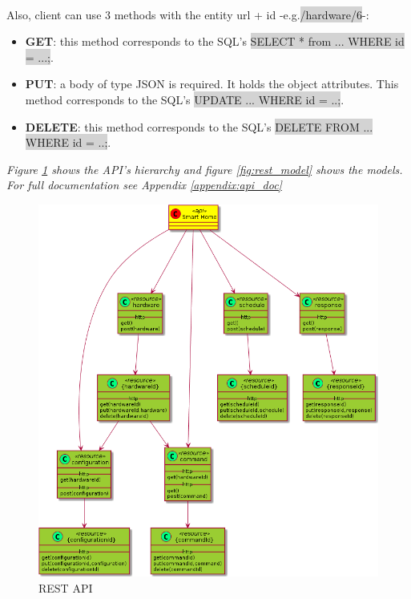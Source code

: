 \documentclass[12pt, oneside, a4paper]{book}
\newcommand{\code}[1]{{\color{red}\colorbox{lightgray}{#1}}}
\begin{document}
			 	\paragraph{}Also, client can use 3 methods with the entity url + id -e.g.\code{/hardware/6}-: 
			 	\begin{itemize}
			 		\item \textbf{GET}: this method corresponds to the SQL's \code{SELECT * from ... WHERE id = ...;}.
			 		\item \textbf{PUT}: a body of type JSON is required. It holds the object attributes. This method corresponds to the SQL's \code{UPDATE ... WHERE id = ..;}.
			 		\item \textbf{DELETE}: this method corresponds to the SQL's \code{DELETE FROM ... WHERE id = ..;}.
			 	\end{itemize} 
		 		\textit{Figure \ref{fig:rest} shows the API's hierarchy and figure \ref{fig:rest_model} shows the models. For full documentation see Appendix \ref{appendix:api_doc}}
				\begin{figure}[H]
					\includegraphics[width=\linewidth]{img/rest_uml.png}
					\caption{REST API}
					\label{fig:rest}
				\end{figure}
\end{document}
